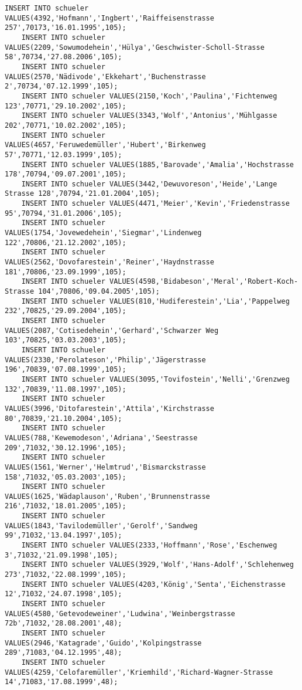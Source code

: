 \begin{lstlisting}[breaklines=True, numbers=none, basicstyle=\tiny, keepspaces=false]
	INSERT INTO schueler VALUES(4392,'Hofmann','Ingbert','Raiffeisenstrasse 257',70173,'16.01.1995',105);
	INSERT INTO schueler VALUES(2209,'Sowumodehein','Hülya','Geschwister-Scholl-Strasse 58',70734,'27.08.2006',105);
	INSERT INTO schueler VALUES(2570,'Nädivode','Ekkehart','Buchenstrasse 2',70734,'07.12.1999',105);
	INSERT INTO schueler VALUES(2150,'Koch','Paulina','Fichtenweg 123',70771,'29.10.2002',105);
	INSERT INTO schueler VALUES(3343,'Wolf','Antonius','Mühlgasse 202',70771,'10.02.2002',105);
	INSERT INTO schueler VALUES(4657,'Feruwedemüller','Hubert','Birkenweg 57',70771,'12.03.1999',105);
	INSERT INTO schueler VALUES(1885,'Barovade','Amalia','Hochstrasse 178',70794,'09.07.2001',105);
	INSERT INTO schueler VALUES(3442,'Dewuvoreson','Heide','Lange Strasse 128',70794,'21.01.2004',105);
	INSERT INTO schueler VALUES(4471,'Meier','Kevin','Friedenstrasse 95',70794,'31.01.2006',105);
	INSERT INTO schueler VALUES(1754,'Jovewedehein','Siegmar','Lindenweg 122',70806,'21.12.2002',105);
	INSERT INTO schueler VALUES(2562,'Dovofarestein','Reiner','Haydnstrasse 181',70806,'23.09.1999',105);
	INSERT INTO schueler VALUES(4598,'Bidabeson','Meral','Robert-Koch-Strasse 104',70806,'09.04.2005',105);
	INSERT INTO schueler VALUES(810,'Hudiferestein','Lia','Pappelweg 232',70825,'29.09.2004',105);
	INSERT INTO schueler VALUES(2087,'Cotisedehein','Gerhard','Schwarzer Weg 103',70825,'03.03.2003',105);
	INSERT INTO schueler VALUES(2330,'Perolateson','Philip','Jägerstrasse 196',70839,'07.08.1999',105);
	INSERT INTO schueler VALUES(3095,'Tovifostein','Nelli','Grenzweg 132',70839,'11.08.1997',105);
	INSERT INTO schueler VALUES(3996,'Ditofarestein','Attila','Kirchstrasse 80',70839,'21.10.2004',105);
	INSERT INTO schueler VALUES(788,'Kewemodeson','Adriana','Seestrasse 209',71032,'30.12.1996',105);
	INSERT INTO schueler VALUES(1561,'Werner','Helmtrud','Bismarckstrasse 158',71032,'05.03.2003',105);
	INSERT INTO schueler VALUES(1625,'Wädaplauson','Ruben','Brunnenstrasse 216',71032,'18.01.2005',105);
	INSERT INTO schueler VALUES(1843,'Tavilodemüller','Gerolf','Sandweg 99',71032,'13.04.1997',105);
	INSERT INTO schueler VALUES(2333,'Hoffmann','Rose','Eschenweg 3',71032,'21.09.1998',105);
	INSERT INTO schueler VALUES(3929,'Wolf','Hans-Adolf','Schlehenweg 273',71032,'22.08.1999',105);
	INSERT INTO schueler VALUES(4203,'König','Senta','Eichenstrasse 12',71032,'24.07.1998',105);
	INSERT INTO schueler VALUES(4580,'Getevodeweiner','Ludwina','Weinbergstrasse 72b',71032,'28.08.2001',48);
	INSERT INTO schueler VALUES(2946,'Katagrade','Guido','Kolpingstrasse 289',71083,'04.12.1995',48);
	INSERT INTO schueler VALUES(4259,'Celofaremüller','Kriemhild','Richard-Wagner-Strasse 14',71083,'17.08.1999',48);

\end{lstlisting}
